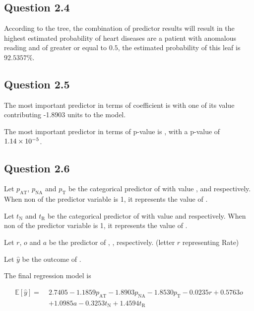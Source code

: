 \documentclass[parskip=full]{scrartcl}
\begin{document}
    \subsection*{Question 2.4}
    
    According to the tree, the combination of predictor results will result in the highest estimated probability of heart diseases are a patient with anomalous  reading and  of greater or equal to $0.5$, the estimated probability of this leaf is $92.5357\%$.

    \subsection*{Question 2.5}
    

    The most important predictor in terms of coefficient is  with one of its value contributing -1.8903 units to the model.

    The most important predictor in terms of p-value is , with a p-value of $1.14\times 10^{-5}$.

    \subsection*{Question 2.6}

    Let $p_{\text{AT}}$, $p_{\text{NA}}$ and $p_{\text{T}}$ be the categorical predictor of  with value ,  and  respectively. When non of the predictor variable is 1, it represents the value of .

    Let $t_{\text{N}}$ and $t_{\text{R}}$ be the categorical predictor of  with value  and  respectively. When non of the predictor variable is 1, it represents the value of .

    Let $r$, $o$ and $a$ be the predictor of , ,  respectively. (letter $r$ representing Rate)

    Let $\hat{y}$ be the outcome of .

    The final regression model is

    \[\begin{split}
        \mathbb{E}[\hat{y}] = \; &
          2.7405
        - 1.1859p_{\text{AT}}
        - 1.8903p_{\text{NA}}
        - 1.8530p_{\text{T}}
        - 0.0235r
        + 0.5763o \\ &
        + 1.0985a
        - 0.3253t_\text{N}
        + 1.4594t_\text{R}
    \end{split}\]
\end{document}
